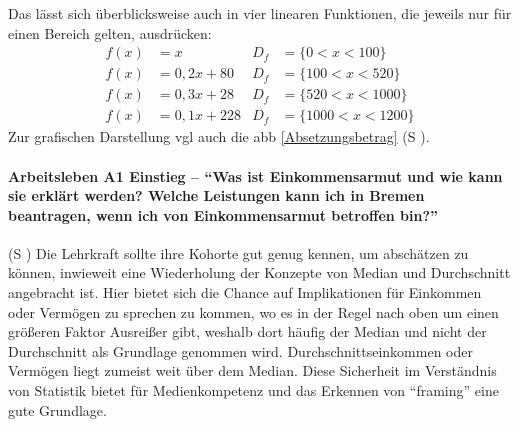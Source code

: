 Das lässt sich überblicksweise auch in vier linearen Funktionen, die jeweils nur für einen Bereich gelten, ausdrücken:
\begin{align} 
f(x)& = x    & 
    D_{f}& = \{0<x<100\}    \\
f(x)& = 0,2x + 80 & 
    D_{f}& = \{100<x<520\}  \\
f(x)& = 0,3x + 28 & 
    D_{f}& = \{520<x<1000\} \\
f(x)& = 0,1x + 228 & 
    D_{f}& = \{1000<x<1200\}
\end{align}
Zur grafischen Darstellung \gls{vgl} auch die \gls{abb} \ref{Absetzungsbetrag} (\gls{S} \pageref{Absetzungsbetrag}).



\paragraph{Arbeitsleben A1 Einstieg -- \enquote{Was ist Einkommensarmut und wie kann sie erklärt werden? Welche Leistungen kann ich in Bremen beantragen, wenn ich von Einkommensarmut betroffen bin?}}  (\gls{S} \pageref{ARBEITSLEBEN-A1})
Die Lehrkraft sollte ihre Kohorte gut genug kennen, um abschätzen zu können, inwieweit eine Wiederholung der Konzepte von Median und Durchschnitt angebracht ist. Hier bietet sich die Chance auf Implikationen für Einkommen oder Vermögen zu sprechen zu kommen, wo es in der Regel nach oben um einen größeren Faktor Ausreißer gibt, weshalb dort häufig der Median und nicht der Durchschnitt als Grundlage genommen wird. Durchschnittseinkommen oder Vermögen liegt zumeist weit über dem Median. Diese Sicherheit im Verständnis von Statistik bietet für Medienkompetenz und das Erkennen von \enquote{framing} eine gute Grundlage.

